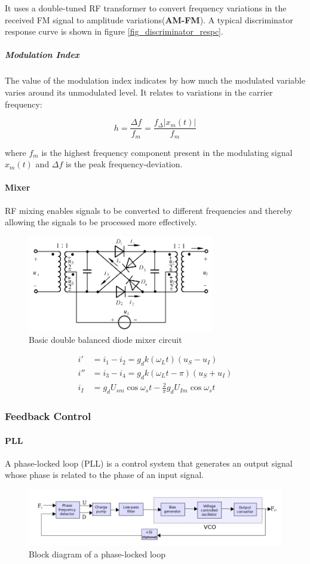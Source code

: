 It uses a double-tuned RF transformer to convert frequency variations in the received FM signal to amplitude variations(\textbf{AM-FM}). A typical discriminator response curve is shown in figure \ref{fig_discriminator_respc}.

\subparagraph{Modulation Index} The value of the modulation index indicates by how much the modulated variable varies around its unmodulated level. It relates to variations in the carrier frequency:

$$h = \frac{\Delta{}f}{f_m} = \frac{f_\Delta |x_m(t)|}{f_m} $$

where $f_m$ is the highest frequency component present in the modulating signal $x_m(t)$ and $\Delta{}f$ is the peak frequency-deviation.

\paragraph{Mixer} RF mixing enables signals to be converted to different frequencies and thereby allowing the signals to be processed more effectively.

\begin{figure}
  \centering
  \includegraphics[width=3.2in]{fig/double-balanced-mixer.png}
  \caption{Basic double balanced diode mixer circuit}\label{fig_mixer}
\end{figure}

\begin{align*}
  i'  &= i_1-i_2=g_dk(\omega_Lt)(u_S-u_I) \\
  i'' &= i_3-i_4=g_dk(\omega_Lt-\pi)(u_S+u_I) \\
  i_I &= g_dU_{sm}\cos\omega_st-\frac{2}{\pi}g_dU_{Im}\cos\omega_st
\end{align*}

\subsubsection{Feedback Control}
\paragraph{PLL} A phase-locked loop (PLL) is a control system that generates an output signal whose phase is related to the phase of an input signal.
\begin{figure}
  \centering
  \includegraphics[width=4.5in]{fig/PLL_generic_inline_optional_N.png}
  \caption{Block diagram of a phase-locked loop}\label{fig_PLL}
\end{figure}

